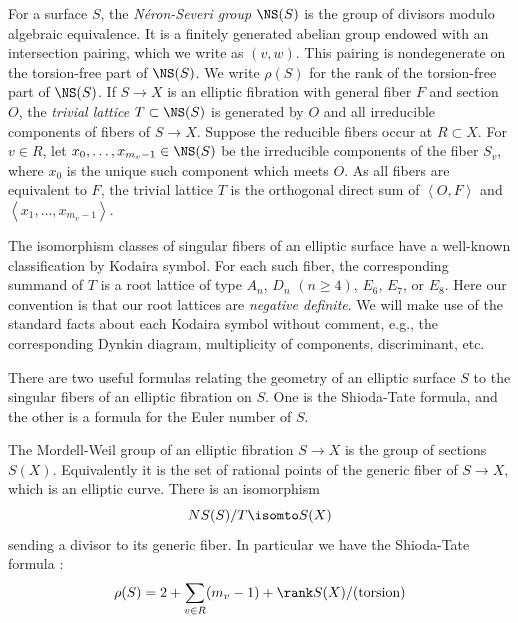 \documentclass{article}
\newcommand{\adam}[1]{\textcolor{blue}{#1}}
\newcommand{\class}[1]{\left< #1 \right>}
\begin{document}

For a surface $S$, the {\em N\'eron-Severi group} $\NS(S)$ is the group of divisors modulo algebraic equivalence.  It is a finitely generated abelian group endowed with an intersection pairing, which we write as $(v,w)$.  This pairing is nondegenerate on the torsion-free part of $\NS(S)$.  We write $\rho(S)$ for the rank of the torsion-free part of $\NS(S)$.  If $S\to X$ is an elliptic fibration with general fiber $F$ and section $O$, the {\em trivial lattice} $T\subset \NS(S)$ is generated by $O$ and all irreducible components of fibers of $S\to X$.  Suppose the reducible fibers occur at $R\subset X$.  For $v\in R$, let $x_0,\dots,x_{m_v-1}\in \NS(S)$ be the irreducible components of the fiber $S_v$, where $x_0$ is the unique such component which meets $O$.  As all fibers are equivalent to $F$, the trivial lattice $T$ is the orthogonal direct sum of $\class{O,F}$ and $\class{x_1,\dots,x_{m_v-1}}$.  

The isomorphism classes of singular fibers of an elliptic surface have a well-known classification by Kodaira symbol.  For each such fiber, the corresponding summand of $T$ is a root lattice of type $A_n$, $D_n$ $(n\geq 4)$, $E_6$, $E_7$, or $E_8$.  Here our convention is that our root lattices are {\em negative definite}.  We will make use of the standard facts about each Kodaira symbol without comment, e.g., the corresponding Dynkin diagram, multiplicity of components, discriminant, etc.

There are two useful formulas relating the geometry of an elliptic surface $S$ to the singular fibers of an elliptic fibration on $S$.  One is the Shioda-Tate formula, and the other is a formula for the Euler number of $S$.


The {Mordell-Weil group} of an elliptic fibration $S\to X$ is the group of sections $S(X)$. Equivalently it is the set of rational points of the generic fiber of $S\to X$, which is an elliptic curve. There is an isomorphism 
\begin{equation}
\label{EqNSFormula}
NS(S)/T \isomto S(X)
\end{equation}
 sending a divisor to its generic fiber.  In particular we have the Shioda-Tate formula \cite[Proposition 6.6]{SchuettShioda}:
 \begin{equation}
 \label{EqShiodaTate}
 \rho(S) = 2+\sum_{v\in R} (m_v-1) + \rank S(X)/(\text{torsion})
\end{equation}
\end{document}

